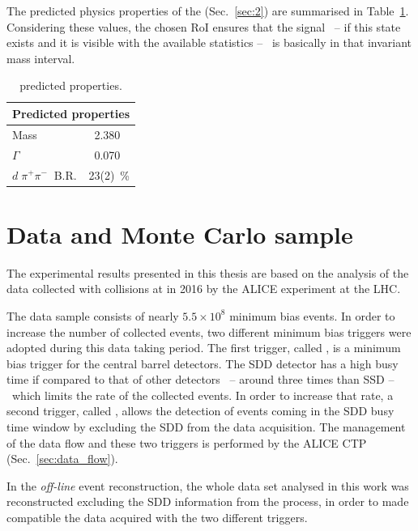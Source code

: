 The predicted physics properties of the \dst (Sec.~\ref{sec:2}) are summarised in Table~\ref{tab:dst_prop}. 
Considering these values, the chosen RoI ensures that the signal \ -- if this state exists and it is visible with the available statistics
-- \ is basically in that invariant mass interval.
\begingroup
\renewcommand{\arraystretch}{1.5} %
\begin{table}
\centering
\captionsetup{justification=centering}
\begin{tabular}{lr}
\multicolumn{2}{c}{\textbf{Predicted properties}}      \\
\toprule
Mass				                   & 2.380 \ \gevcs   \\
$\Gamma$			        	       & 0.070 \ \gevcs   \\
$d\; \pi^{+} \pi^{-}\ $ B.R.	 & 23(2)\ \%		    \\
\midrule
\end{tabular}
\caption{\dst predicted properties.}
\label{tab:dst_prop}
\end{table}
\endgroup

%
%
\section{Data and Monte Carlo sample} \label{sec:4.2}

The experimental results presented in this thesis are based on the analysis of the data collected with \pPb collisions at \sctev in 2016 by the ALICE experiment at the LHC. 

The data sample  consists of nearly $5.5\times10^{8}$ minimum bias events.
In order to increase the number of collected events, two
different minimum bias triggers were adopted during this data taking period.
The first trigger, called , is a minimum bias trigger for the central barrel
detectors. The SDD detector has a high busy time if compared to that of other detectors \ -- around three times
than SSD -- \ which limits the rate of the collected events. 
In order to increase that rate, a second trigger, called , allows the detection of events coming in the SDD busy time window by excluding the SDD from the data acquisition.
The management of the data flow and these two triggers is performed by the ALICE 
CTP (Sec.~\ref{sec:data_flow}).

In the \textit{off-line} event reconstruction, the whole data set analysed in this work was
reconstructed excluding the SDD information from the process, in order to made compatible
the data acquired with the two different triggers.

